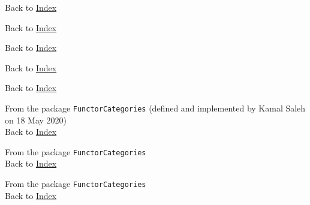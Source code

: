 
\lstlistoflistings\label{lol}

\renewcommand{\lstlistingname}{Procedure}



Back to \hyperref[lol]{Index}


Back to \hyperref[lol]{Index}
		

Back to \hyperref[lol]{Index}
		

Back to \hyperref[lol]{Index}
		

Back to \hyperref[lol]{Index}
		

From the package \texttt{FunctorCategories} (defined and implemented by Kamal Saleh on 18 May 2020) \\
Back to \hyperref[lol]{Index}


From the package \texttt{FunctorCategories}\\
Back to \hyperref[lol]{Index}
		

From the package \texttt{FunctorCategories}\\
Back to \hyperref[lol]{Index}

		

